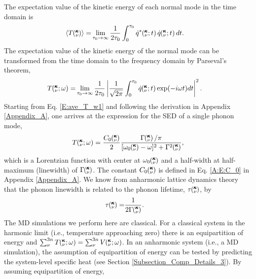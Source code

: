 The expectation value of the kinetic energy of each normal mode in
the time domain is
\begin{equation}\label{A:E:ave_T_t}
\begin{split}
\langle T\kv \rangle=&\lim_{\tau_0\rightarrow\infty}
\frac{1}{2\tau_0}\int_{0}^{\tau_0}\dot{q}^*\kvt\dot{q}\kvt dt.
\end{split}
\end{equation}
The expectation value of the kinetic energy of the normal mode can
be transformed from the time domain to the
frequency domain by Parseval's theorem,\cite{rudin_real_1987}
\begin{equation}\label{E:ave_T_w1}
\begin{split}
T\kvw=&\lim_{\tau_0\rightarrow\infty}\frac{1}{2\tau_0}
\left|\frac{1}{\sqrt{2\pi}}\int_{0}^{\tau_0}\dot{q}\kvt
\exp(-i\omega t)dt\right|^2.
\end{split}
\end{equation}
Starting from Eq$.$ \eqref{E:ave_T_w1} and following the derivation in
Appendix \ref{Appendix_A}, one arrives at the expression for the SED 
of a single phonon mode,
\begin{equation}\label{E:Lorentzian_NMD_2}
\begin{split}
T\kvw = \frac{C_0\kv}{2}\frac{\Gamma\kv/\pi}
{[\omega_0\kv-\omega]^2+\Gamma^2\kv},
\end{split}
\end{equation}
which is a Lorentzian function with center at $\omega_0\kv$ and a 
half-width at half-maximum (linewidth) of
$\Gamma\kv$. The constant $C_0\kv$ is defined in Eq$.$ \eqref{A:E:C_0} in 
Appendix \ref{Appendix_A}. We know from anharmonic lattice dynamics theory 
that the phonon linewidth is related to the phonon lifetime, $\tau\kv$, 
by\cite{maradudin_scattering_1962,ladd_lattice_1986}
\begin{equation}\label{E:lifetime}
\begin{split}
\tau\kv=&\frac{1}{2\Gamma\kv}.
\end{split}
\end{equation}
The MD simulations we perform here are classical. For a classical system 
in the harmonic limit (i.e., temperature approaching zero) there is an 
equipartition of energy and $\sum_{\nu}^{3n} T\kvw = \sum_{\nu}^{3n} 
V\kvw$.\cite{mcquarrie_statistical_2000} 
In an anharmonic system (i.e., a MD 
simulation), the assumption of equipartition of energy can be tested 
by predicting the system-level specific heat (see Section 
\ref{Subsection_Comp_Details_3}). By assuming equipartition of energy, 
